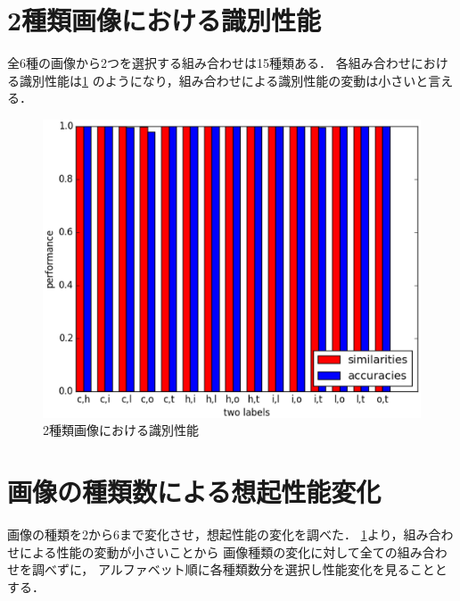\documentclass[10pt,twocolumn]{jarticle}
\newcommand{\figref}[1]{\figurename\ref{fig:#1}}
\begin{document}
\section{2種類画像における識別性能}\label{sec:two-label-performance}
全6種の画像から2つを選択する組み合わせは15種類ある．
各組み合わせにおける識別性能は\figref{two-label-performance}
のようになり，組み合わせによる識別性能の変動は小さいと言える．
\begin{figure}[htpb]
  \centering
    \includegraphics[width=\columnwidth]{figs/two_label_performance}
    \caption{2種類画像における識別性能}
    \label{fig:two-label-performance}
\end{figure}


\section{画像の種類数による想起性能変化}
画像の種類を2から6まで変化させ，想起性能の変化を調べた．
\ref{sec:two-label-performance}より，組み合わせによる性能の変動が小さいことから
画像種類の変化に対して全ての組み合わせを調べずに，
アルファベット順に各種類数分を選択し性能変化を見ることとする．
\end{document}
